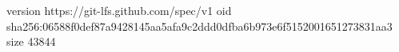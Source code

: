 version https://git-lfs.github.com/spec/v1
oid sha256:06588f0def87a9428145aa5afa9c2ddd0dfba6b973e6f5152001651273831aa3
size 43844
